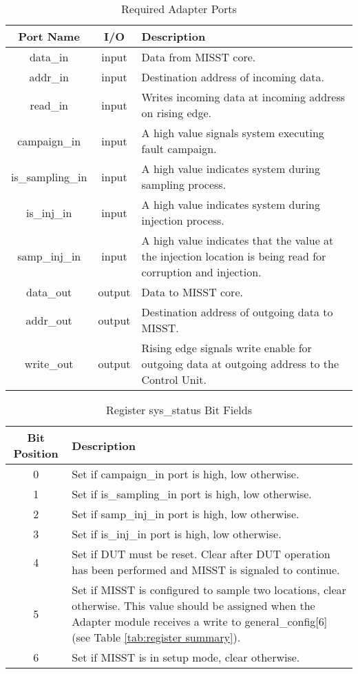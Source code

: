 \documentclass[]{report}
\begin{document}
\begin{table}[h]
	\centering
	\caption{Required Adapter Ports}
	\begin{tabular}{|c|c|p{12cm}|}
		\hline 
		Port Name & I/O & Description \\ 
		\hline 
		data\_in & input & Data from MISST core. \\ 
		\hline 
		addr\_in & input & Destination address of incoming data. \\ 
		\hline 
		read\_in & input & Writes incoming data at incoming address on rising edge. \\ 
		\hline 
		campaign\_in & input & A high value signals system executing fault campaign. \\ 
		\hline 
		is\_sampling\_in & input & A high value indicates system during sampling process. \\ 
		\hline 
		is\_inj\_in & input & A high value indicates system during injection process. \\ 
		\hline
		samp\_inj\_in & input & A high value indicates that the value at the injection location is being read for corruption and injection. \\
		\hline 
		data\_out & output & Data to MISST core. \\ 
		\hline 
		addr\_out & output & Destination address of outgoing data to MISST. \\ 
		\hline 
		write\_out & output & Rising edge signals write enable for outgoing data at outgoing address to the Control Unit. \\ 
		\hline 
	\end{tabular} 
	\label{table:adapter required ports}
\end{table}

\begin{table}[ht]
	\centering
	\caption{Register sys\_status Bit Fields}
	\begin{tabular}{|c|p{}|}
		\hline 
		Bit Position & Description \\ 
		\hline
		0 & Set if campaign\_in port is high, low otherwise.\\
		\hline
		1 & Set if is\_sampling\_in port is high, low otherwise.\\
		\hline
		2 & Set if samp\_inj\_in port is high, low otherwise.\\
		\hline
		3 & Set if is\_inj\_in port is high, low otherwise.\\
		\hline
		4 & Set if DUT must be reset. Clear after DUT operation has been performed and MISST is signaled to continue.\\
		\hline
		5 & Set if MISST is configured to sample two locations, clear otherwise. This value should be assigned when the Adapter module receives a write to general\_config[6] (see Table \ref{tab:register summary}).\\
		\hline
		6 & Set if MISST is in setup mode, clear otherwise.\\
		\hline
	\end{tabular} 
\label{table:sys_status bit fields}
\end{table}
\end{document}
